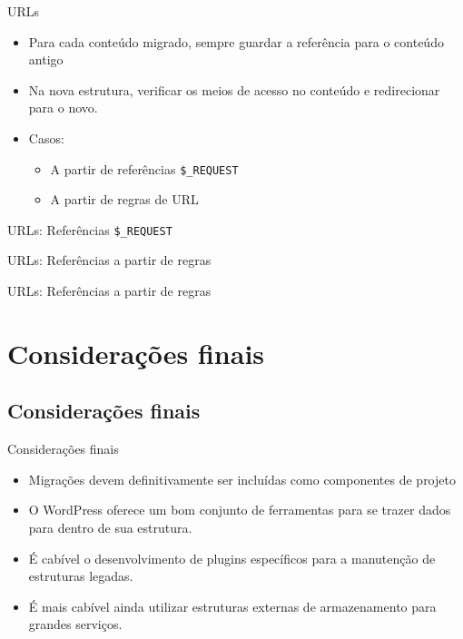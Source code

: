 \documentclass[handout]{beamer}
\begin{document}
\begin{frame}{URLs}
  \begin{itemize}
    \item Para cada conteúdo migrado, sempre guardar a referência
          para o conteúdo antigo
    \pause \item Na nova estrutura, verificar os meios de acesso no conteúdo
           e redirecionar para o novo.
    \pause \item Casos:
    \begin{itemize}
      \item A partir de referências \texttt{\$\_REQUEST}
      \item A partir de regras de URL
    \end{itemize}
  \end{itemize}
\end{frame}

\begin{frame}{URLs: Referências \texttt{\$\_REQUEST}}
  
\end{frame}

\begin{frame}{URLs: Referências a partir de regras}
  
\end{frame}

\begin{frame}{URLs: Referências a partir de regras}
  
\end{frame}

\section{Considerações finais}
\subsection{Considerações finais}

\begin{frame}{Considerações finais}
  \begin{itemize}
    \pause \item Migrações devem definitivamente ser incluídas como componentes
      de projeto
    \pause \item O WordPress oferece um bom conjunto de ferramentas para se
      trazer dados para dentro de sua estrutura.
    \pause \item É cabível o desenvolvimento de plugins específicos para a
      manutenção de estruturas legadas.
    \item É mais cabível ainda utilizar estruturas externas de armazenamento
      para grandes serviços.
  \end{itemize}
\end{frame}
\end{document}
